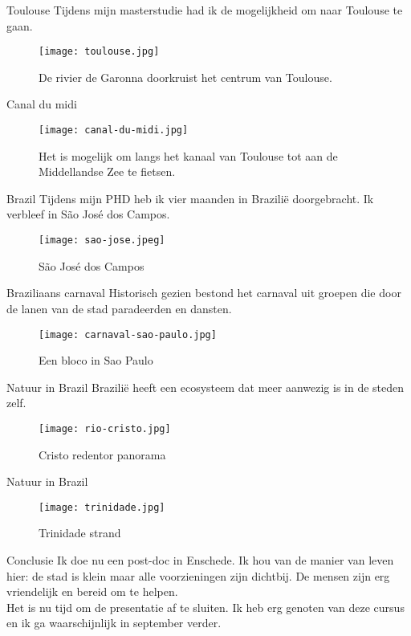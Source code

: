 \documentclass{beamer}
\begin{document}
	\begin{frame}{Toulouse}
		Tijdens mijn masterstudie had ik de mogelijkheid om naar Toulouse te gaan.
		\begin{figure}
			\centering
			\texttt{[image: toulouse.jpg]}
			\caption{De rivier de Garonna doorkruist het centrum van Toulouse.}
		\end{figure}
	\end{frame}

	\begin{frame}{Canal du midi}
		\begin{figure}
			\centering
			\texttt{[image: canal-du-midi.jpg]}
			\caption{Het is mogelijk om langs het kanaal van Toulouse tot aan de Middellandse Zee te fietsen.}
		\end{figure}
	\end{frame}

	\begin{frame}{Brazil}
		Tijdens mijn PHD heb ik vier maanden in Brazilië doorgebracht. Ik verbleef in São José dos Campos.
		\begin{figure}
			\centering
			\texttt{[image: sao-jose.jpeg]}
			\caption{São José dos Campos}
		\end{figure}
	\end{frame}

	\begin{frame}{Braziliaans carnaval}
		Historisch gezien bestond het carnaval uit groepen die door de lanen van de stad paradeerden en dansten.
		\begin{figure}
			\centering
			\texttt{[image: carnaval-sao-paulo.jpg]}
			\caption{Een bloco in Sao Paulo}
		\end{figure}
	\end{frame}

\begin{frame}{Natuur in Brazil}
	Brazilië heeft een ecosysteem dat meer aanwezig is in de steden zelf.
	\begin{figure}
		\centering
			\texttt{[image: rio-cristo.jpg]}
		\caption{Cristo redentor panorama}
	\end{figure}
\end{frame}

\begin{frame}{Natuur in Brazil}
	\begin{figure}
		\centering
		\texttt{[image: trinidade.jpg]}
		\caption{Trinidade strand}
	\end{figure}
\end{frame}

\begin{frame}{Conclusie}
	Ik doe nu een post-doc in Enschede. Ik hou van de manier van leven hier: de stad is klein maar alle voorzieningen zijn dichtbij. De mensen zijn erg vriendelijk en bereid om te helpen. \\ 
	
	\vspace{1cm}
	Het is nu tijd om de presentatie af te sluiten. Ik heb erg genoten van deze cursus en ik ga waarschijnlijk in september verder. 
\end{frame}

	
\end{document}
